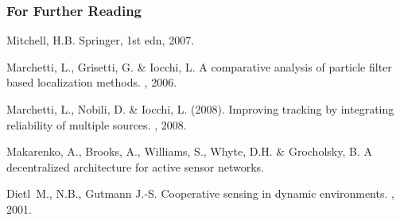 \begin{frame}[allowframebreaks]
                \frametitle<presentation>{For Further Reading}

                \begin{thebibliography}{10}

                                \beamertemplatebookbibitems
                                {\sc Mitchell, H.B.}
                                \newblock Springer, 1st edn,  2007.

                                \beamertemplatearticlebibitems

                                {\sc Marchetti, L., Grisetti, G. \& Iocchi, L.}
                                \newblock A comparative analysis of particle filter based localization methods.
                                , 2006.
                                
                                {\sc Marchetti, L., Nobili, D. \& Iocchi, L.} (2008).
                                \newblock Improving tracking by integrating reliability of multiple sources.
                                , 2008.

                                {\sc Makarenko, A., Brooks, A., Williams, S., Whyte, D.H. \& Grocholsky, B.}
                                \newblock A decentralized architecture for active sensor networks.

                                {\sc Dietl~M., N.B., Gutmann J.-S.}
                                \newblock Cooperative sensing in dynamic environments.
                                , 2001.


\end{thebibliography}
\end{frame}
